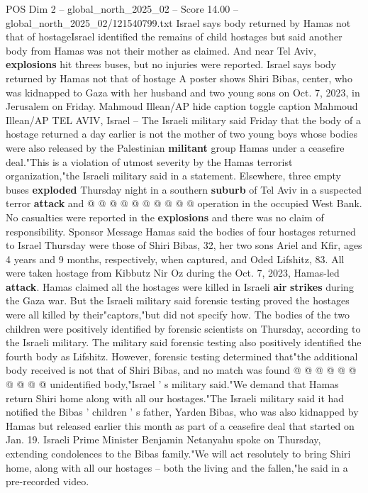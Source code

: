 \begin{textsample}{POS Dim 2 – global\_north\_2025\_02 – Score 14.00 – global\_north\_2025\_02/121540799.txt}  \label{ex:f2_pos_432}
Israel says body returned by Hamas not that of hostageIsrael identified the remains of child hostages but said another body from Hamas was not their mother as claimed.
And near Tel Aviv, \textbf{explosions} hit threes buses, but no injuries were reported.
Israel says body returned by Hamas not that of hostage A poster shows Shiri Bibas, center, who was kidnapped to Gaza with her husband and two young sons on Oct. 7, 2023, in Jerusalem on Friday.
Mahmoud Illean/AP hide caption toggle caption Mahmoud Illean/AP TEL AVIV, Israel -- The Israeli military said Friday that the body of a hostage returned a day earlier is not the mother of two young boys whose bodies were also released by the Palestinian \textbf{militant} group Hamas under a ceasefire deal."This is a violation of utmost severity by the Hamas terrorist organization,"the Israeli military said in a statement.
Elsewhere, three empty buses \textbf{exploded} Thursday night in a southern \textbf{suburb} of Tel Aviv in a suspected terror \textbf{attack} and @ @ @ @ @ @ @ @ @ @ operation in the occupied West Bank.
No casualties were reported in the \textbf{explosions} and there was no claim of responsibility.
Sponsor Message Hamas said the bodies of four hostages returned to Israel Thursday were those of Shiri Bibas, 32, her two sons Ariel and Kfir, ages 4 years and 9 months, respectively, when captured, and Oded Lifshitz, 83.
All were taken hostage from Kibbutz Nir Oz during the Oct. 7, 2023, Hamas-led \textbf{attack}.
Hamas claimed all the hostages were killed in Israeli \textbf{air} \textbf{strikes} during the Gaza war.
But the Israeli military said forensic testing proved the hostages were all killed by their"captors,"but did not specify how.
The bodies of the two children were positively identified by forensic scientists on Thursday, according to the Israeli military.
The military said forensic testing also positively identified the fourth body as Lifshitz.
However, forensic testing determined that"the additional body received is not that of Shiri Bibas, and no match was found @ @ @ @ @ @ @ @ @ @ unidentified body,"Israel ' s military said."We demand that Hamas return Shiri home along with all our hostages."The Israeli military said it had notified the Bibas ' children ' s father, Yarden Bibas, who was also kidnapped by Hamas but released earlier this month as part of a ceasefire deal that started on Jan. 19.
Israeli Prime Minister Benjamin Netanyahu spoke on Thursday, extending condolences to the Bibas family."We will act resolutely to bring Shiri home, along with all our hostages -- both the living and the fallen,"he said in a pre-recorded video.

\end{textsample}
